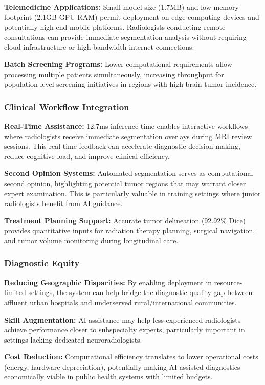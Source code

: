 \textbf{Telemedicine Applications:} Small model size (1.7MB) and low memory footprint (2.1GB GPU RAM) permit deployment on edge computing devices and potentially high-end mobile platforms. Radiologists conducting remote consultations can provide immediate segmentation analysis without requiring cloud infrastructure or high-bandwidth internet connections.

\textbf{Batch Screening Programs:} Lower computational requirements allow processing multiple patients simultaneously, increasing throughput for population-level screening initiatives in regions with high brain tumor incidence.

\subsubsection{Clinical Workflow Integration}

\textbf{Real-Time Assistance:} 12.7ms inference time enables interactive workflows where radiologists receive immediate segmentation overlays during MRI review sessions. This real-time feedback can accelerate diagnostic decision-making, reduce cognitive load, and improve clinical efficiency.

\textbf{Second Opinion Systems:} Automated segmentation serves as computational second opinion, highlighting potential tumor regions that may warrant closer expert examination. This is particularly valuable in training settings where junior radiologists benefit from AI guidance.

\textbf{Treatment Planning Support:} Accurate tumor delineation (92.92\% Dice) provides quantitative inputs for radiation therapy planning, surgical navigation, and tumor volume monitoring during longitudinal care.

\subsubsection{Diagnostic Equity}

\textbf{Reducing Geographic Disparities:} By enabling deployment in resource-limited settings, the system can help bridge the diagnostic quality gap between affluent urban hospitals and underserved rural/international communities.

\textbf{Skill Augmentation:} AI assistance may help less-experienced radiologists achieve performance closer to subspecialty experts, particularly important in settings lacking dedicated neuroradiologists.

\textbf{Cost Reduction:} Computational efficiency translates to lower operational costs (energy, hardware depreciation), potentially making AI-assisted diagnostics economically viable in public health systems with limited budgets.


